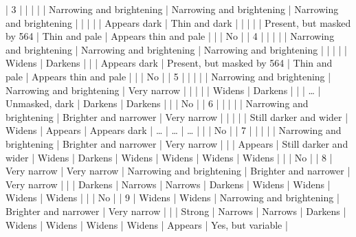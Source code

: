 \documentclass[a4paper, 12pt, oneside, polutonikogreek, english]{article}
\begin{document}
| 3               | |               | |               | Narrowing and brightening   | Narrowing and brightening   | Narrowing and brightening      | |                   | |                  | Appears dark            | Thin and dark            | |                  | |                  | Present, but masked by 564     | Thin and pale            | Appears thin and pale        | |                  | No               |
| 4               | |               | |               | Narrowing and brightening   | Narrowing and brightening   | Narrowing and brightening      | |                   | |                  | Widens               | Darkens               | |                  | Appears dark            | Present, but masked by 564     | Thin and pale            | Appears thin and pale        | |                  | No               |
| 5               | |               | |               | Narrowing and brightening   | Narrowing and brightening   | Very narrow             | |                   | |                  | Widens               | Darkens               | |                  | …                  | Unmasked, dark           | Darkens               | Darkens               | |                  | No               |
| 6               | |               | |               | Narrowing and brightening   | Brighter and narrower     | Very narrow             | |                   | |                  | Still darker and wider       | Widens               | Appears               | Appears dark            | …                  | …                  | …                  | |                  | No               |
| 7               | |               | |               | Narrowing and brightening   | Brighter and narrower     | Very narrow             | |                   | Appears               | Still darker and wider       | Widens               | Darkens               | Widens               | Widens               | Widens               | Widens               | |                  | No               |
| 8               | Very narrow          | Very narrow          | Narrowing and brightening   | Brighter and narrower     | Very narrow             | |                   | Darkens               | Narrows               | Narrows               | Darkens               | Widens               | Widens               | Widens               | Widens               | |                  | No               |
| 9               | Widens            | Widens            | Narrowing and brightening   | Brighter and narrower     | Very narrow             | |                   | Strong               | Narrows               | Narrows               | Darkens               | Widens               | Widens               | Widens               | Widens               | Appears               | Yes, but variable        |
\end{document}
